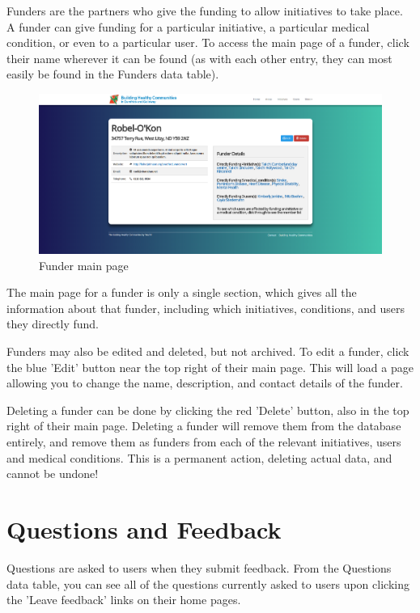 \documentclass{bhcguides}
\begin{document}
Funders are the partners who give the funding to allow initiatives to take place. A funder can give funding for a particular initiative, a particular medical condition, or even to a particular user. To access the main page of a funder, click their name wherever it can be found (as with each other entry, they can most easily be found in the Funders data table).

\begin{figure}[h]
 \centerline{\includegraphics[width=\textwidth, height=\textheight, keepaspectratio]{fundermainpage.png}}
 \caption{Funder main page}
 \label{fig:funderMainPage}
\end{figure}

The main page for a funder is only a single section, which gives all the information about that funder, including which initiatives, conditions, and users they directly fund.

Funders may also be edited and deleted, but not archived. To edit a funder, click the blue 'Edit' button near the top right of their main page. This will load a page allowing you to change the name, description, and contact details of the funder.

Deleting a funder can be done by clicking the red 'Delete' button, also in the top right of their main page. Deleting a funder will remove them from the database entirely, and remove them as funders from each of the relevant initiatives, users and medical conditions. This is a permanent action, deleting actual data, and cannot be undone!

\pagebreak

\section{Questions and Feedback}
\label{sec:questions}

Questions are asked to users when they submit feedback. From the Questions data table, you can see all of the questions currently asked to users upon clicking the 'Leave feedback' links on their home pages.
\end{document}
